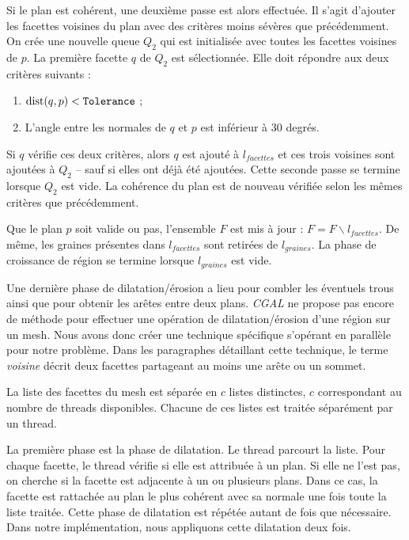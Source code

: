 ﻿\documentclass[12pt, twoside]{article}
\begin{document}
Si le plan est cohérent, une deuxième passe est alors effectuée. Il s'agit d'ajouter les facettes voisines du plan avec des critères moins sévères que précédemment. On crée une nouvelle queue $Q_2$ qui est initialisée avec toutes les facettes voisines de $p$. La première facette $q$ de $Q_2$ est sélectionnée. Elle doit répondre aux deux critères suivants :
\begin{enumerate}
  \item $\text{dist}(q, p) < \text{\texttt{Tolerance}}$ ;
  \item L'angle entre les normales de $q$ et $p$ est inférieur à 30 degrés.
\end{enumerate}
Si $q$ vérifie ces deux critères, alors $q$ est ajouté à $l_{facettes}$ et ces trois voisines sont ajoutées à $Q_2$ -- sauf si elles ont déjà été ajoutées. Cette seconde passe se termine lorsque $Q_2$ est vide. La cohérence du plan est de nouveau vérifiée selon les mêmes critères que précédemment.

Que le plan $p$ soit valide ou pas, l'ensemble $F$ est mis à jour : $F = F\backslash l_{facettes}$. De même, les graines présentes dans $l_{facettes}$ sont retirées de $l_{graines}$. La phase de croissance de région se termine lorsque $l_{graines}$ est vide.

Une dernière phase de dilatation/érosion a lieu pour combler les éventuels trous ainsi que pour obtenir les arêtes entre deux plans. \textit{CGAL} ne propose pas encore de méthode pour effectuer une opération de dilatation/érosion d'une région sur un mesh. Nous avons donc créer une technique spécifique s'opérant en parallèle  pour notre problème. Dans les paragraphes détaillant cette technique, le terme \textit{voisine} décrit deux facettes partageant au moins une arête ou un sommet.

La liste des facettes du mesh est séparée en $c$ listes distinctes, $c$ correspondant au nombre de threads disponibles. Chacune de ces listes est traitée séparément par un thread.

La première phase est la phase de dilatation. Le thread parcourt la liste. Pour chaque facette, le thread vérifie si elle est attribuée à un plan. Si elle ne l'est pas, on cherche si la facette est adjacente à un ou plusieurs plans. Dans ce cas, la facette est rattachée au plan le plus cohérent avec sa normale une fois toute la liste traitée. Cette phase de dilatation est répétée autant de fois que nécessaire. Dans notre implémentation, nous appliquons cette dilatation deux fois.
\end{document}
